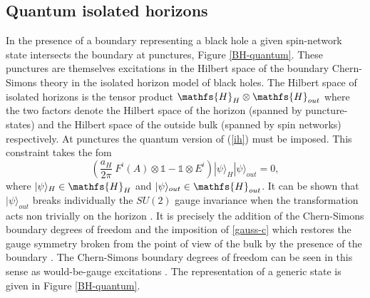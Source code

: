 \documentclass[aps, nofootinbib,superscriptaddress,12pt]{revtex4-2}
\def\be{\begin{equation}}
\def\ee{\end{equation}}
\newcommand{\mfs}[1]{\mathfs {#1}}                               %
\newcommand{\sH}{{\mfs H}}
\begin{document}

\subsection{Quantum isolated horizons}\label{CSQ}

In the presence of a boundary representing a black hole a given spin-network state intersects the boundary at punctures, Figure \ref{BH-quantum}. These punctures 
are themselves excitations in the Hilbert space of the boundary Chern-Simons theory 
in the isolated horizon model of black holes.  The Hilbert space of isolated horizons is the tensor product  $\sH_{H}\otimes\sH_{out}$ where the two factors denote the Hilbert space of the horizon (spanned by puncture-states) and the Hilbert space of the outside bulk (spanned by spin networks) respectively.  At punctures the quantum version of (\ref{ih}) must be imposed. This constraint takes the fom
\be\label{gauss-c}
\left(\frac{a_{H}}{2\pi}\  F^i(A)\otimes \mathds{1}-\mathds{1}\otimes E^i\right)|\psi\rangle_{H} |\psi\rangle_{out} =0,
\ee
where $|\psi\rangle_{H}\in \sH_{H}$ and $|\psi\rangle_{out}\in \sH_{out}$. It can be shown that $|\psi\rangle_{ out}$
breaks individually the $SU(2)$ gauge invariance when the transformation acts non trivially on the horizon \cite{Cattaneo:2016zsq}. It is precisely the addition of the Chern-Simons boundary degrees of freedom and the imposition of \eqref{gauss-c} which restores the gauge symmetry broken from the point of view of the bulk by the presence of the boundary \cite{Engle:2010kt}.  The Chern-Simons boundary degrees of freedom  can be seen in this sense as would-be-gauge excitations \cite{Benguria:1976in, Carlip:2005zn}.
The representation of a generic state is given in Figure \ref{BH-quantum}.
\end{document}
